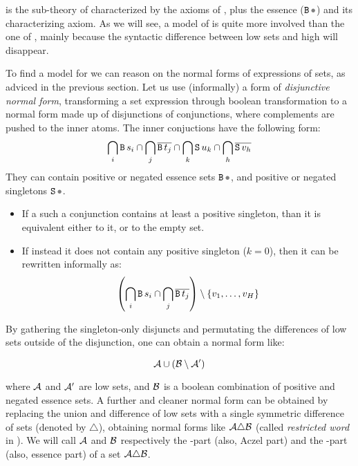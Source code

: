 
\renewcommand\INX{\coqref{NFO.In.IN}{{\IN}}~}

\NFO{} is the sub-theory of \NF{} characterized by the axioms of \NFTWO{}, plus the essence ($\Essence\Placeholder$) and its characterizing axiom. As we will see, a model of \NFO{} is quite more involved than the one of \NFTWO{}, mainly because the syntactic difference between low sets and high will disappear.

\medskip

To find a model for \NFO{} we can reason on the normal forms of expressions of sets, as adviced in the previous section.
% 
Let us use (informally) a form of \emph{disjunctive normal form}, transforming a set expression through boolean transformation to a normal form made up of disjunctions of conjunctions, where complements are pushed to the inner atoms. The inner conjuctions have the following form:
\[\bigcap_i\text{\texttt{B}}\,s_i\cap \bigcap_j \overline{\text{\texttt{B}}\,t_j} \cap \bigcap_k \text{\texttt{S}}\,u_k \cap \bigcap_h \overline{\text{\texttt{S}}\,v_h}\]
They can contain positive or negated essence sets $\Essence\Placeholder$, and positive or negated singletons $\Sing\Placeholder$.

\begin{itemize}
  \item 
    If a such a conjunction contains at least a positive singleton, than it is equivalent either to it, or to the empty set.
  \item If instead it does not contain any positive singleton ($k=0$), then it can be rewritten informally as:
  \[\left(\bigcap_i\text{\texttt{B}}\,s_i\cap \bigcap_j \overline{\text{\texttt{B}}\,t_j}\right) \setminus \{v_1, \ldots, v_H\} \]
\end{itemize}

By gathering the singleton-only disjuncts and permutating the differences of low sets outside of the disjunction, one can obtain a normal form like:

\[\mathcal{A} \cup (\mathcal{B} \setminus \mathcal{A}')\]

where $\mathcal{A}$ and $\mathcal{A}'$ are low sets, and $\mathcal{B}$ is a boolean combination of positive and negated essence sets. A further and cleaner normal form can be obtained by replacing the union and difference of low sets with a single symmetric difference of sets (denoted by $\triangle$), obtaining normal forms like $\mathcal{A} \triangle \mathcal{B}$ (called \emph{restricted word} in \cite{Forster2001}). We will call $\mathcal{A}$ and $\mathcal{B}$ respectively the \A-part (also, Aczel part) and the \B-part (also, essence part) of a \NFO{} set $\mathcal{A} \triangle \mathcal{B}$.

